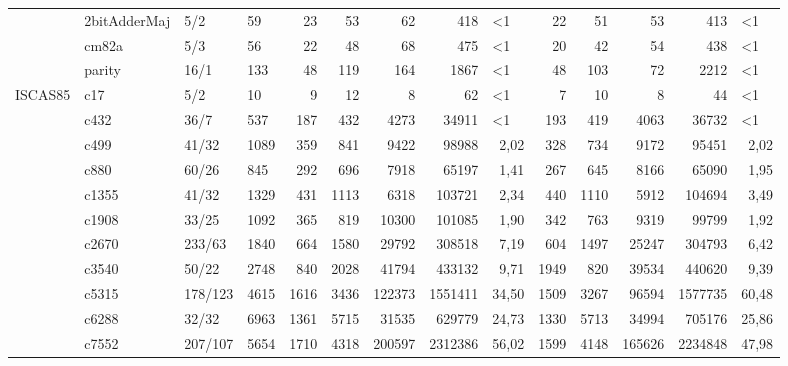 \begin{sidewaystable}[htbp]
{\begin{tabular}{|r|l|l|l|r|r|r|r|r|r|r|r|r|r|}
		& 2bitAdderMaj & 5/2   & 59    & 23    & 53    & 62    & 418   & \multicolumn{1}{l|}{<1} & 22    & 51    & 53    & 413   & \multicolumn{1}{l|}{<1} \\
		& cm82a & 5/3   & 56    & 22    & 48    & 68    & 475   & \multicolumn{1}{l|}{<1} & 20    & 42    & 54    & 438   & \multicolumn{1}{l|}{<1} \\
		& parity & 16/1  & 133   & 48    & 119   & 164   & 1867  & \multicolumn{1}{l|}{<1} & 48    & 103   & 72    & 2212  & \multicolumn{1}{l|}{<1} \\
		\midrule
		\multicolumn{1}{|l|}{ISCAS85} & c17   & 5/2   & 10    & 9     & 12    & 8     & 62    & \multicolumn{1}{l|}{<1} & 7     & 10    & 8     & 44    & \multicolumn{1}{l|}{<1} \\
		& c432  & 36/7  & 537   & 187   & 432   & 4273  & 34911 & \multicolumn{1}{l|}{<1} & 193   & 419   & 4063  & 36732 & \multicolumn{1}{l|}{<1} \\
		& c499  & 41/32 & 1089  & 359   & 841   & 9422  & 98988 & 2,02  & 328   & 734   & 9172  & 95451 & 2,02 \\
		& c880  & 60/26 & 845   & 292   & 696   & 7918  & 65197 & 1,41  & 267   & 645   & 8166  & 65090 & 1,95 \\
		& c1355 & 41/32 & 1329  & 431   & 1113  & 6318  & 103721 & 2,34  & 440   & 1110  & 5912  & 104694 & 3,49 \\
		& c1908 & 33/25 & 1092  & 365   & 819   & 10300 & 101085 & 1,90  & 342   & 763   & 9319  & 99799 & 1,92 \\
		& c2670 & 233/63 & 1840  & 664   & 1580  & 29792 & 308518 & 7,19  & 604   & 1497  & 25247 & 304793 & 6,42 \\
		& c3540 & 50/22 & 2748  & 840   & 2028  & 41794 & 433132 & 9,71  & 1949  & 820   & 39534 & 440620 & 9,39 \\
		& c5315 & 178/123 & 4615  & 1616  & 3436  & 122373 & 1551411 & 34,50 & 1509  & 3267  & 96594 & 1577735 & 60,48 \\
		& c6288 & 32/32 & 6963  & 1361  & 5715  & 31535 & 629779 & 24,73 & 1330  & 5713  & 34994 & 705176 & 25,86 \\
		& c7552 & 207/107 & 5654  & 1710  & 4318  & 200597 & 2312386 & 56,02 & 1599  & 4148  & 165626 & 2234848 & 47,98 \\
		\bottomrule
	\end{tabular}}%

\end{sidewaystable}%


